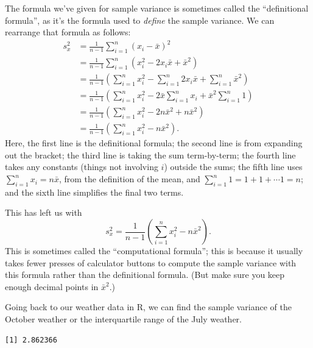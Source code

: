 \documentclass[
  a4paper,
]{book}
\newenvironment{Shaded}{\begin{snugshade}}{\end{snugshade}}
\newcommand{\FunctionTok}[1]{\textcolor[rgb]{0.13,0.29,0.53}{\textbf{#1}}}
\newcommand{\NormalTok}[1]{#1}
\newcommand{\SpecialCharTok}[1]{\textcolor[rgb]{0.81,0.36,0.00}{\textbf{#1}}}
\theoremstyle{definition}
\theoremstyle{definition}
\theoremstyle{definition}
\theoremstyle{definition}
\theoremstyle{remark}
\begin{document}
The formula we've given for sample variance is sometimes called the ``definitional formula'', as it's the formula used to \emph{define} the sample variance. We can rearrange that formula as follows:
\begin{align*}
  s^2_x &= \frac{1}{n-1} \sum_{i=1}^n (x_i - \bar x)^2 \\
      &= \frac{1}{n-1} \sum_{i=1}^n (x_i^2 - 2x_i\bar x + \bar x^2) \\
      &= \frac{1}{n-1}\left(\sum_{i=1}^nx_i^2 - \sum_{i=1}^n 2x_i\bar x + \sum_{i=1}^n\bar x^2 \right) \\
      &= \frac{1}{n-1} \left(\sum_{i=1}^n x_i^2 - 2\bar x \sum_{i=1}^n x_i + \bar x^2 \sum_{i=1}^n 1 \right) \\
      &= \frac{1}{n-1} \left(\sum_{i=1}^n x_i^2 - 2n\bar x^2 + n\bar x^2 \right) \\
      &= \frac{1}{n-1} \left(\sum_{i=1}^n x_i^2 -  n\bar x^2 \right) .
\end{align*}
Here, the first line is the definitional formula; the second line is from expanding out the bracket; the third line is taking the sum term-by-term; the fourth line takes any constants (things not involving \(i\)) outside the sums; the fifth line uses \(\sum_{i=1}^n x_i = n\bar x\), from the definition of the mean, and \(\sum_{i=1}^n 1 = 1 + 1 + \cdots 1 = n\); and the sixth line simplifies the final two terms.

This has left us with
\[ s^2_x = \frac{1}{n-1} \left(\sum_{i=1}^n x_i^2 -  n\bar x^2 \right) . \]
This is sometimes called the ``computational formula''; this is because it usually takes fewer presses of calculator buttons to compute the sample variance with this formula rather than the definitional formula. (But make sure you keep enough decimal points in \(\bar x^2\).)

Going back to our weather data in R, we can find the sample variance of the October weather or the interquartile range of the July weather.

\begin{Shaded}
\end{Shaded}

\begin{verbatim}
[1] 2.862366
\end{verbatim}

\begin{Shaded}
\end{Shaded}
\end{document}
